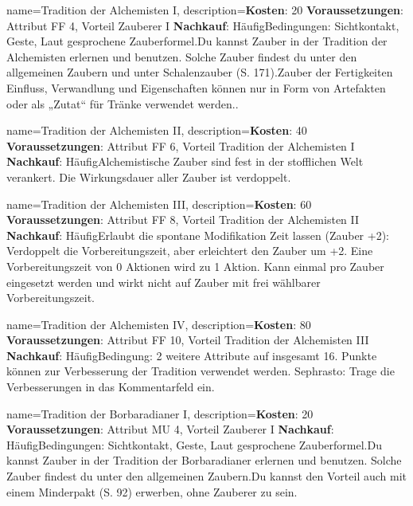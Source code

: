 {
    name={Tradition der Alchemisten I},
    description={\textbf{Kosten}: 20 \textbf{Voraussetzungen}: Attribut FF 4, Vorteil Zauberer I \textbf{Nachkauf}: Häufig\newline Bedingungen: Sichtkontakt, Geste, Laut gesprochene Zauberformel.\newline Du kannst Zauber in der Tradition der Alchemisten erlernen und benutzen. Solche Zauber findest du unter den allgemeinen Zaubern und unter Schalenzauber (S. 171).\newline Zauber der Fertigkeiten Einfluss, Verwandlung und Eigenschaften können nur in Form von Artefakten oder als „Zutat“ für Tränke verwendet werden..}
}


{
    name={Tradition der Alchemisten II},
    description={\textbf{Kosten}: 40 \textbf{Voraussetzungen}: Attribut FF 6, Vorteil Tradition der Alchemisten I \textbf{Nachkauf}: Häufig\newline Alchemistische Zauber sind fest in der stofflichen Welt verankert. Die Wirkungsdauer aller Zauber ist verdoppelt.}
}


{
    name={Tradition der Alchemisten III},
    description={\textbf{Kosten}: 60 \textbf{Voraussetzungen}: Attribut FF 8, Vorteil Tradition der Alchemisten II \textbf{Nachkauf}: Häufig\newline Erlaubt die spontane Modifikation Zeit lassen (Zauber +2): Verdoppelt die Vorbereitungszeit, aber erleichtert den Zauber um +2. Eine Vorbereitungszeit von 0 Aktionen wird zu 1 Aktion. Kann einmal pro Zauber eingesetzt werden und wirkt nicht auf Zauber mit frei wählbarer Vorbereitungszeit.}
}


{
    name={Tradition der Alchemisten IV},
    description={\textbf{Kosten}: 80 \textbf{Voraussetzungen}: Attribut FF 10, Vorteil Tradition der Alchemisten III \textbf{Nachkauf}: Häufig\newline Bedingung: 2 weitere Attribute auf insgesamt 16. Punkte können zur Verbesserung der Tradition verwendet werden. Sephrasto: Trage die Verbesserungen in das Kommentarfeld ein.}
}


{
    name={Tradition der Borbaradianer I},
    description={\textbf{Kosten}: 20 \textbf{Voraussetzungen}: Attribut MU 4, Vorteil Zauberer I \textbf{Nachkauf}: Häufig\newline Bedingungen: Sichtkontakt, Geste, Laut gesprochene Zauberformel.\newline Du kannst Zauber in der Tradition der Borbaradianer erlernen und benutzen. Solche Zauber findest du unter den allgemeinen Zaubern.\newline Du kannst den Vorteil auch mit einem Minderpakt (S. 92) erwerben, ohne Zauberer zu sein.}
}


